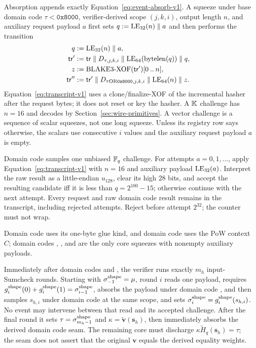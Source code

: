 Absorption appends exactly Equation~\eqref{eq:event-absorb-v1}.  A squeeze
under base domain code $\tau<\mathtt{0x8000}$, verifier-derived scope
$(j,k,i)$, output length $n$, and auxiliary request payload $a$ first sets
$q:=\operatorname{LE}_{32}(n)\parallel a$ and then performs the transition
\begin{equation}
 \begin{aligned}
  q&:=\operatorname{LE}_{32}(n)\parallel a,\\
  \mathsf{tr}'&:=\mathsf{tr}\parallel D_{\tau,j,k,i}
    \parallel\operatorname{LE}_{64}(\operatorname{bytelen}(q))\parallel q,\\
  z&:=\operatorname{BLAKE3\text{-}XOF}(\mathsf{tr}')[0\mathbin{..}n],\\
  \mathsf{tr}''&:=\mathsf{tr}'\parallel
    D_{\tau\mathbin{\mathrm{OR}}\mathtt{0x8000},j,k,i}
    \parallel\operatorname{LE}_{64}(n)\parallel z.
 \end{aligned}
 \label{eq:transcript-v1}
\end{equation}
Equation~\eqref{eq:transcript-v1} uses a clone/finalize-XOF of the incremental
hasher after the request bytes; it does not reset or key the hasher.  A $\mathbb K$ challenge has
$n=16$ and decodes by Section~\ref{sec:wire-primitives}.  A vector challenge
is a sequence of scalar squeezes, not one long squeeze.  Unless its registry
row says otherwise, the scalars use consecutive $i$ values and the auxiliary
request payload $a$ is empty.

Domain code  samples one unbiased $\mathbb F_q$ challenge.  For attempts
$a=0,1,\ldots$, apply Equation~\eqref{eq:transcript-v1} with $n=16$ and
auxiliary payload $\operatorname{LE}_{32}(a)$.  Interpret the raw result as a little-endian
$u_{128}$, clear its high $28$ bits, and accept the resulting candidate iff it
is less than $q=2^{100}-15$; otherwise continue with the next attempt.  Every
request and raw domain code  result remains in the transcript, including
rejected attempts.  Reject before attempt $2^{32}$; the counter must not wrap.

Domain code  uses its one-byte glue kind, and domain code  uses the PoW
context $C$; domain codes , , and  are the only core
squeezes with nonempty auxiliary payloads.

Immediately after domain codes  and , the verifier runs exactly
$m_h$ input-Sumcheck rounds.  Starting with
$\sigma_{-1}^{\rm shape}=\mu$, round $i$ reads one payload, requires
$g_i^{\rm shape}(0)+g_i^{\rm shape}(1)=\sigma_{i-1}^{\rm shape}$, absorbs the
payload under domain code , and then samples
$s_{h,i}$ under domain code  at the same scope, and sets
$\sigma_i^{\rm shape}=g_i^{\rm shape}(s_{h,i})$.  No event may intervene
between that read and its accepted challenge.  After the final round it sets
$\tau=\sigma_{m_h-1}^{\rm shape}$ and
$\kappa=\widetilde{\bm v}(\bm s_h)$, then immediately absorbs the derived
domain code  seam.  The remaining core must discharge
$\kappa\widetilde H_q(\bm s_h)=\tau$; the seam does not assert that the
original $\bm v$ equals the derived equality weights.

